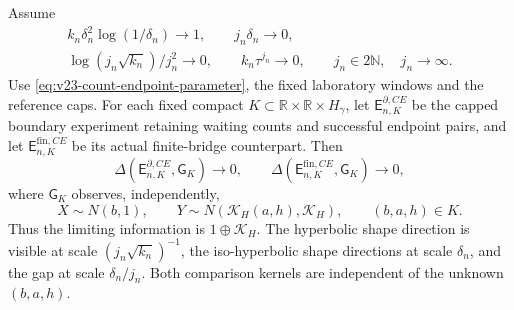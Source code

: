 \begin{theorem}
\label{thm:v23-count-endpoint-joint}
Assume
\begin{equation}\label{eq:v23-count-endpoint-conditions}
 \begin{gathered}
 k_n\delta_n^2\log(1/\delta_n)\to1,\qquad j_n\delta_n\to0,\\
 \log(j_n\sqrt{k_n})/j_n^2\to0,\qquad
 k_n\tau^{j_n}\to0,\qquad j_n\in2\mathbb N,\quad j_n\to\infty.
 \end{gathered}
\end{equation}
Use \eqref{eq:v23-count-endpoint-parameter}, the fixed laboratory windows and
the reference caps.  For each fixed compact
\(K\subset\mathbb R\times\mathbb R\times H_\gamma\), let
\(\mathsf E^{\partial,CE}_{n,K}\) be the capped boundary experiment retaining
waiting counts and successful endpoint pairs, and let
\(\mathsf E^{\mathrm{fin},CE}_{n,K}\) be its actual finite-bridge counterpart.
Then
\begin{equation}\label{eq:v23-count-endpoint-limit}
 \Delta(\mathsf E^{\partial,CE}_{n,K},\mathsf G_K)\to0,
 \qquad
 \Delta(\mathsf E^{\mathrm{fin},CE}_{n,K},\mathsf G_K)\to0,
\end{equation}
where \(\mathsf G_K\) observes, independently,
\[
 X\sim N(b,1),\qquad
 Y\sim N(\mathcal K_H(a,h),\mathcal K_H),
 \qquad (b,a,h)\in K.
\]
Thus the limiting information is \(1\oplus\mathcal K_H\).  The hyperbolic
shape direction is visible at scale \((j_n\sqrt{k_n})^{-1}\), the
iso-hyperbolic shape directions at scale \(\delta_n\), and the gap at
scale \(\delta_n/j_n\).  Both comparison kernels are independent of the
unknown \((b,a,h)\).
\end{theorem}

